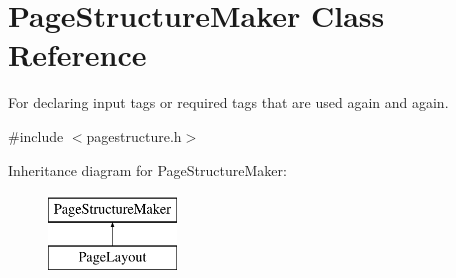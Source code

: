 \hypertarget{classPageStructureMaker}{\section{Page\-Structure\-Maker Class Reference}
\label{classPageStructureMaker}
}


For declaring input tags or required tags that are used again and again.  




{\ttfamily \#include $<$pagestructure.\-h$>$}

Inheritance diagram for Page\-Structure\-Maker\-:\begin{figure}[H]
\begin{center}
\leavevmode
\includegraphics[height=2.000000cm]{de/d88/classPageStructureMaker}
\end{center}
\end{figure}
